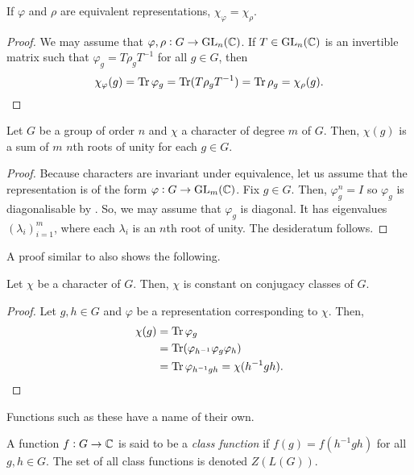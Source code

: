 		\begin{prop}
			\label{prop: character same under equiv}
			If $\varphi$ and $\rho$ are equivalent representations, $\chi_\varphi = \chi_\rho$.
		\end{prop}
		\begin{proof}
			We may assume that $\varphi,\rho : G \to \operatorname{GL}_n(\mathbb{C})$. If $T \in \operatorname{GL}_n(\mathbb{C})$ is an invertible matrix such that $\varphi_g = T \rho_g T^{-1}$ for all $g \in G$, then
			\[ \chi_\varphi(g) = \operatorname{Tr} \varphi_g = \operatorname{Tr} (T \rho_g T^{-1}) = \operatorname{Tr} \rho_g = \chi_\rho(g). \qedhere \]
		\end{proof}

		\begin{corollary}
			\label{cor: character sum of roots of unity}
			Let $G$ be a group of order $n$ and $\chi$ a character of degree $m$ of $G$. Then, $\chi(g)$ is a sum of $m$ $n$th roots of unity for each $g \in G$.
		\end{corollary}
		\begin{proof}
			Because characters are invariant under equivalence, let us assume that the representation is of the form $\varphi : G \to \operatorname{GL}_m(\mathbb{C})$. Fix $g \in G$. Then, $\varphi_g^n = I$ so $\varphi_g$ is diagonalisable by . So, we may assume that $\varphi_g$ is diagonal. It has eigenvalues $(\lambda_i)_{i=1}^m$, where each $\lambda_i$ is an $n$th root of unity. The desideratum follows.
		\end{proof}

		A proof similar to  also shows the following.

		\begin{fprop}
			Let $\chi$ be a character of $G$. Then, $\chi$ is constant on conjugacy classes of $G$.
		\end{fprop}
		\begin{proof}
			Let $g,h \in G$ and $\varphi$ be a representation corresponding to $\chi$. Then,
			\begin{align*}
				\chi(g) &= \operatorname{Tr} \varphi_g \\
					&= \operatorname{Tr} (\varphi_{h^{-1}} \varphi_g \varphi_h) \\
					&= \operatorname{Tr} \varphi_{h^{-1}gh} = \chi(h^{-1}gh). \qedhere
			\end{align*}
		\end{proof}

		Functions such as these have a name of their own.

		\begin{fdef}
			A function $f : G \to \mathbb{C}$ is said to be a \emph{class function} if $f(g) = f(h^{-1}gh)$ for all $g,h \in G$. The set of all class functions is denoted $Z(L(G))$.
		\end{fdef}

